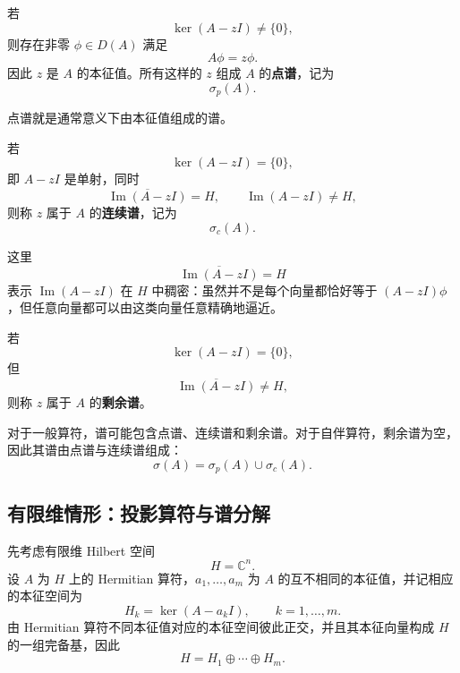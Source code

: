 \documentclass[UTF8,a4paper,11pt,openany]{ctexbook}
\begin{document}
\begin{definition}[点谱]
若
\begin{equation}
    \ker(A-zI)\neq\{0\},
\end{equation}
则存在非零 $\phi\in D(A)$ 满足
\[
A\phi=z\phi.
\]
因此 $z$ 是 $A$ 的本征值。所有这样的 $z$ 组成 $A$ 的\textbf{点谱}，记为
\[
\sigma_p(A).
\]
\end{definition}

点谱就是通常意义下由本征值组成的谱。

\begin{definition}[连续谱]
若
\[
\ker(A-zI)=\{0\},
\]
即 $A-zI$ 是单射，同时
\begin{equation}
    \overline{\operatorname{Im}(A-zI)}=H,
    \qquad
    \operatorname{Im}(A-zI)\neq H,
\end{equation}
则称 $z$ 属于 $A$ 的\textbf{连续谱}，记为
\[
\sigma_c(A).
\]
\end{definition}

这里
\[
\overline{\operatorname{Im}(A-zI)}=H
\]
表示 $\operatorname{Im}(A-zI)$ 在 $H$ 中稠密：虽然并不是每个向量都恰好等于 $(A-zI)\phi$，但任意向量都可以由这类向量任意精确地逼近。

\begin{definition}[剩余谱]
若
\[
\ker(A-zI)=\{0\},
\]
但
\begin{equation}
    \overline{\operatorname{Im}(A-zI)}
    \neq H,
\end{equation}
则称 $z$ 属于 $A$ 的\textbf{剩余谱}。
\end{definition}

对于一般算符，谱可能包含点谱、连续谱和剩余谱。对于自伴算符，剩余谱为空，因此其谱由点谱与连续谱组成：
\begin{equation}
    \sigma(A)
    =
    \sigma_p(A)\cup\sigma_c(A).
\end{equation}

\subsection{有限维情形：投影算符与谱分解}

先考虑有限维 Hilbert 空间
\[
H=\mathbb C^n.
\]
设 $A$ 为 $H$ 上的 Hermitian 算符，$a_1,\ldots,a_m$ 为 $A$ 的互不相同的本征值，并记相应的本征空间为
\[
H_k=\ker(A-a_kI),
\qquad k=1,\ldots,m.
\]
由 Hermitian 算符不同本征值对应的本征空间彼此正交，并且其本征向量构成 $H$ 的一组完备基，因此
\begin{equation}
    H=H_1\oplus\cdots\oplus H_m.
\end{equation}
\end{document}
